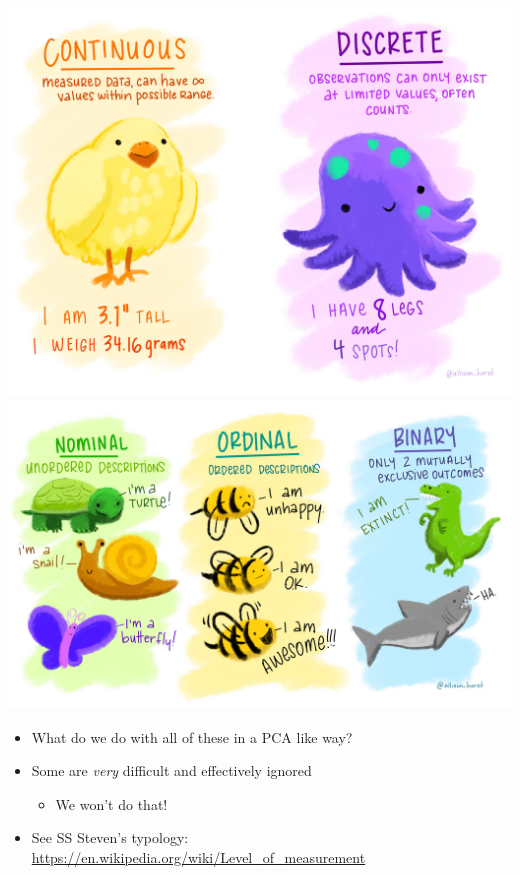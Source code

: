\documentclass[
  ignorenonframetext,
]{beamer}
\providecommand{\tightlist}{%
  \setlength{\itemsep}{0pt}\setlength{\parskip}{0pt}}
\begin{document}
\begin{frame}

\includegraphics[width=\textwidth,height=0.4\textheight]{../images/cont_disc.jpg}\includegraphics[width=\textwidth,height=0.4\textheight]{../images/nom_ord_bin.jpg}

\begin{itemize}[<+->]
\tightlist
\item
  What do we do with all of these in a PCA like way?
\item
  Some are \emph{very} difficult and effectively ignored

  \begin{itemize}[<+->]
  \tightlist
  \item
    We won't do that!
  \end{itemize}
\item
  See SS Steven's typology:
  \url{https://en.wikipedia.org/wiki/Level_of_measurement}
\end{itemize}

\end{frame}
\end{document}
